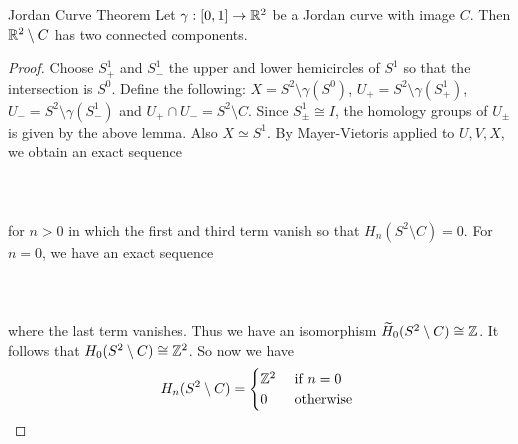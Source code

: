 \documentclass[a4paper]{article}
\begin{document}
\begin{thm}{Jordan Curve Theorem}{} Let $\gamma:[0,1]\to\mathbb{R}^2$ be a Jordan curve with image $C$. Then $\mathbb{R}^2\setminus C$ has two connected components.  \tcbline
\begin{proof}
Choose $S_+^1$ and $S_-^1$ the upper and lower hemicircles of $S^1$ so that the intersection is $S^0$. Define the following: $X=S^2\setminus\gamma(S^0)$, $U_+=S^2\setminus\gamma(S_+^1)$, $U_-=S^2\setminus\gamma(S_-^1)$ and $U_+\cap U_-=S^2\setminus C$. Since $S_\pm^1\cong I$, the homology groups of $U_\pm$ is given by the above lemma. Also $X\simeq S^1$. By Mayer-Vietoris applied to $U,V,X$, we obtain an exact sequence \\~\\
\\~\\
for $n>0$ in which the first and third term vanish so that $H_n(S^2\setminus C)=0$. For $n=0$, we have an exact sequence \\~\\
\\~\\
where the last term vanishes. Thus we have an isomorphism $\widetilde{H}_0(S^2\setminus C)\cong\mathbb{Z}$. It follows that $H_0(S^2\setminus C)\cong\mathbb{Z}^2$. So now we have $$H_n(S^2\setminus C)=\begin{cases}
\mathbb{Z}^2 & \text{ if } n=0\\
0 & \text{ otherwise }
\end{cases}$$


\end{proof}
\end{thm}
\end{document}
